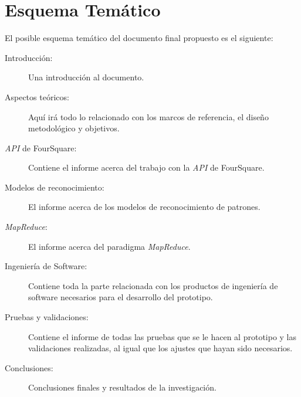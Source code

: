 \chapter{Esquema Tem\'atico}
\label{sec:esquema}
El posible esquema tem\'atico del documento final propuesto es el siguiente:

\begin{description}
\item[Introducci\'on:] Una introducci\'on al documento.
\item[Aspectos te\'oricos:] Aqu\'i ir\'a todo lo relacionado con los marcos de referencia, el dise\~no metodol\'ogico y objetivos.
\item[\textit{API} de FourSquare:] Contiene el informe acerca del trabajo con la \textit{API} de FourSquare.
\item[Modelos de reconocimiento:] El informe acerca de los modelos de reconocimiento de patrones.
\item[\textit{MapReduce}:] El informe acerca del paradigma \textit{MapReduce}.
\item[Ingenier\'ia de Software:] Contiene toda la parte relacionada con los productos de ingenier\'ia de software necesarios para el desarrollo del prototipo.
\item[Pruebas y validaciones:] Contiene el informe de todas las pruebas que se le hacen al prototipo y las validaciones realizadas, al igual que los ajustes que hayan sido necesarios.
\item[Conclusiones:] Conclusiones finales y resultados de la investigaci\'on.
\end{description}

\pagebreak